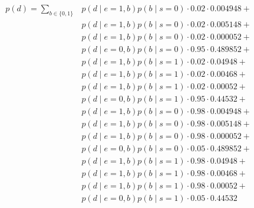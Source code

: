 \documentclass[12pt]{report}
\begin{document}
\begin{align*}    
    p(d) = \sum_{b \in \{0,1\}}  
        &p(d\mid e=1,b)p(b\mid s=0) \cdot  0.02 \cdot 0.004948 + \\
        &p(d\mid e=1,b)p(b\mid s=0) \cdot  0.02 \cdot 0.005148 + \\ 
        &p(d\mid e=1,b)p(b\mid s=0) \cdot  0.02 \cdot 0.000052 + \\
        &p(d\mid e=0,b)p(b\mid s=0) \cdot  0.95 \cdot 0.489852 + \\        
        &p(d\mid e=1,b)p(b\mid s=1) \cdot  0.02 \cdot 0.04948 + \\
        &p(d\mid e=1,b)p(b\mid s=1) \cdot  0.02 \cdot 0.00468 + \\ 
        &p(d\mid e=1,b)p(b\mid s=1) \cdot  0.02 \cdot 0.00052 + \\
        &p(d\mid e=0,b)p(b\mid s=1) \cdot  0.95 \cdot 0.44532 + \\
        &p(d\mid e=1,b)p(b\mid s=0) \cdot  0.98 \cdot 0.004948 + \\
        &p(d\mid e=1,b)p(b\mid s=0) \cdot  0.98 \cdot 0.005148 + \\ 
        &p(d\mid e=1,b)p(b\mid s=0) \cdot  0.98 \cdot 0.000052 + \\
        &p(d\mid e=0,b)p(b\mid s=0) \cdot  0.05 \cdot 0.489852 + \\        
        &p(d\mid e=1,b)p(b\mid s=1) \cdot  0.98 \cdot 0.04948 + \\
        &p(d\mid e=1,b)p(b\mid s=1) \cdot  0.98 \cdot 0.00468 + \\ 
        &p(d\mid e=1,b)p(b\mid s=1) \cdot  0.98 \cdot 0.00052 + \\
        &p(d\mid e=0,b)p(b\mid s=1) \cdot  0.05 \cdot 0.44532
\end{align*}
\end{document}
